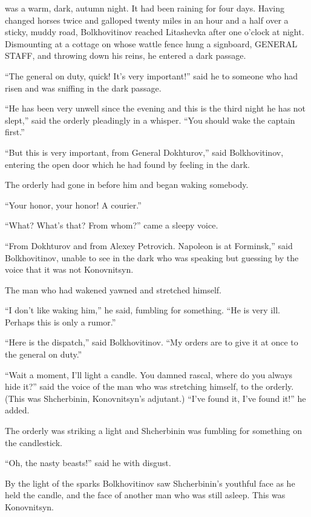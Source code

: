  was a warm, dark, autumn night. It had been raining for four
days.  Having changed horses twice and galloped twenty miles in
an hour and a half over a sticky, muddy road, Bolkhovitinov
reached Litashevka after one o'clock at night. Dismounting at a
cottage on whose wattle fence hung a signboard, GENERAL STAFF,
and throwing down his reins, he entered a dark passage.

``The general on duty, quick! It's very important!'' said he to
someone who had risen and was sniffing in the dark passage.

``He has been very unwell since the evening and this is the third
night he has not slept,'' said the orderly pleadingly in a
whisper. ``You should wake the captain first.''

``But this is very important, from General Dokhturov,'' said
Bolkhovitinov, entering the open door which he had found by
feeling in the dark.

The orderly had gone in before him and began waking somebody.

``Your honor, your honor! A courier.''

``What? What's that? From whom?'' came a sleepy voice.

``From Dokhturov and from Alexey Petrovich. Napoleon is at
Forminsk,'' said Bolkhovitinov, unable to see in the dark who was
speaking but guessing by the voice that it was not Konovnitsyn.

The man who had wakened yawned and stretched himself.

``I don't like waking him,'' he said, fumbling for
something. ``He is very ill. Perhaps this is only a rumor.''

``Here is the dispatch,'' said Bolkhovitinov. ``My orders are to
give it at once to the general on duty.''

``Wait a moment, I'll light a candle. You damned rascal, where do
you always hide it?'' said the voice of the man who was
stretching himself, to the orderly. (This was Shcherbinin,
Konovnitsyn's adjutant.) ``I've found it, I've found it!'' he
added.

The orderly was striking a light and Shcherbinin was fumbling for
something on the candlestick.

``Oh, the nasty beasts!'' said he with disgust.

By the light of the sparks Bolkhovitinov saw Shcherbinin's
youthful face as he held the candle, and the face of another man
who was still asleep.  This was Konovnitsyn.

